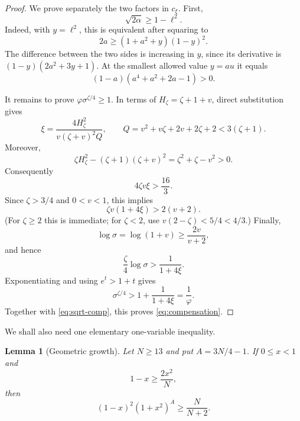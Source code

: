 \documentclass[11pt]{article}
\newtheorem{lemma}[theorem]{Lemma}
\begin{document}
\begin{proof}
We prove separately the two factors in $c_\xi$.
First,
\begin{equation}\label{eq:sqrt-comp}
        \sqrt{2\alpha}\ge1-\ell^2.
\end{equation}
Indeed, with $y=\ell^2$, this is equivalent after squaring to
\[
        2a\ge(1+a^2+y)(1-y)^2.
\]
The difference between the two sides is increasing in $y$, since its
derivative is $(1-y)(2a^2+3y+1)$.  At the smallest allowed value
$y=au$ it equals
\[
        (1-a)(a^4+a^2+2a-1)>0.
\]

It remains to prove $\varphi\sigma^{\zeta/4}\ge1$.  In terms of
$H_\zeta=\zeta+1+v$, direct substitution gives
\begin{equation}\label{eq:xi-zeta-v}
 \xi=\frac{4H_\zeta^2}
 {v(\zeta+v)^2Q},
 \qquad
 Q=v^2+v\zeta+2v+2\zeta+2<3(\zeta+1).
\end{equation}
Moreover,
\[
 \zeta H_\zeta^2-(\zeta+1)(\zeta+v)^2
 =\zeta^2+\zeta-v^2>0.
\]
Consequently
\begin{equation}\label{eq:xi-large-enough}
        4\zeta v\xi>\frac{16}{3}.
\end{equation}
Since $\zeta>3/4$ and $0<v<1$, this implies
\[
        \zeta v(1+4\xi)>2(v+2).
\]
(For $\zeta\ge2$ this is immediate; for $\zeta<2$, use
$v(2-\zeta)<5/4<4/3$.)  Finally,
\[
 \log\sigma=\log(1+v)\ge\frac{2v}{v+2},
\]
and hence
\[
 \frac\zeta4\log\sigma>
 \frac1{1+4\xi}.
\]
Exponentiating and using $e^t>1+t$ gives
\[
 \sigma^{\zeta/4}>
 1+\frac1{1+4\xi}=\frac1\varphi.
\]
Together with \eqref{eq:sqrt-comp}, this proves
\eqref{eq:compensation}.
\end{proof}

We shall also need one elementary one-variable inequality.

\begin{lemma}[Geometric growth]\label{lem:geometric-growth}
Let $N\ge13$ and put $A=3N/4-1$.  If $0\le x<1$ and
\begin{equation}\label{eq:growth-assumption}
        1-x\ge\frac{2x^2}{N},
\end{equation}
then
\begin{equation}\label{eq:growth-conclusion}
        (1-x)^2(1+x^2)^A\ge\frac{N}{N+2}.
\end{equation}
\end{lemma}
\end{document}
